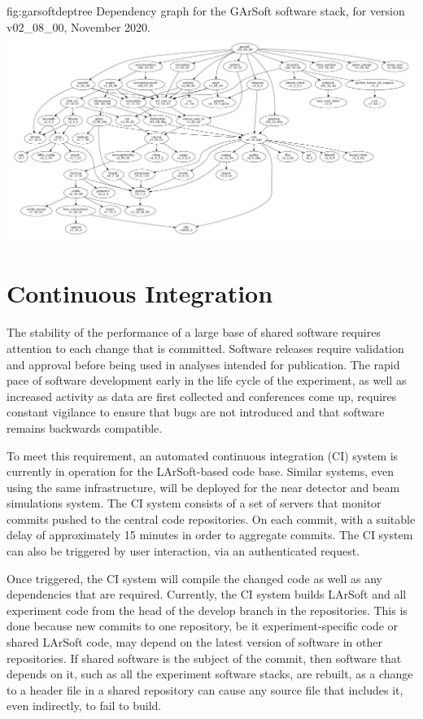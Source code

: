 \documentclass[../main-v1.tex]{subfiles}
\begin{document}
\begin{dunefigure}
{fig:garsoftdeptree}
{Dependency graph for the GArSoft software stack, for version v02\_08\_00, November 2020.}
\includegraphics[width=\textwidth]{graphics/CodeManagementFigures/garsoft_v02_08_00_depgraph.pdf}
\end{dunefigure}

\section{Continuous Integration }
\label{sec:codemgmt:ci}

The stability of the performance of a large base of shared software requires attention to each change that is committed.  Software releases require validation and approval before being used in analyses intended for publication.  The rapid pace of software development early in the life cycle of the experiment, as well as increased activity as data are first collected and conferences come up, requires constant vigilance to ensure that bugs are not introduced and that software remains backwards compatible.

To meet this requirement, an automated continuous integration (CI) system is currently in operation for the LArSoft-based code base.  Similar systems, even using the same infrastructure, will be deployed for the near detector and beam simulations system.  The CI system consists of a set of servers that monitor commits pushed to the central code repositories.  On each commit, with a suitable delay of approximately 15 minutes in order to aggregate commits.  The CI system can also be triggered by user interaction, via an authenticated request.

Once triggered, the CI system will compile the changed code as well as any dependencies that are required.  Currently, the CI system builds LArSoft and all experiment code from the head of the develop branch in the repositories.  This is done because new commits to one repository, be it experiment-specific code or shared LArSoft code, may depend on the latest version of software in other repositories.  If shared software is the subject of the commit, then software that depends on it, such as all the experiment software stacks, are rebuilt, as a change to a header file in a shared repository can cause any source file that includes it, even indirectly, to fail to build.
\end{document}
